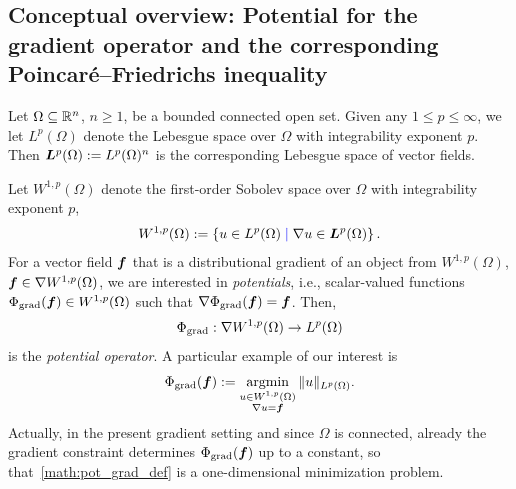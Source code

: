\documentclass[10pt,a4paper]{article}
\newcommand\cye[1]{%
\protect\leavevmode
\begingroup
    \color{blue}%
    #1%
\endgroup
}
\begin{document}
\subsection{Conceptual overview: Potential for the gradient operator and the corresponding Poincar\'e--Friedrichs inequality} \label{subsection:intro_grad}

Let $\Omega \subseteq {\mathbb R}^n$, $n \geq 1$, be a bounded connected open set. Given any $1 \leq p \leq \infty$, we let $L^{p}(\Omega)$ denote the Lebesgue space over $\Omega$ with integrability exponent $p$. Then $\bm{L}^{p}(\Omega) := L^{p}(\Omega)^{n}$ is the corresponding Lebesgue space of vector  fields. 

Let $W^{1,p}(\Omega)$ denote the first-order Sobolev space over $\Omega$ with integrability exponent $p$, 
\begin{align} \label{equation:W1p}
    W^{1,p}(\Omega) := \left\{u \in L^{p}(\Omega) \cye{\suchthat} \nabla u \in \bfL^{p}(\Omega) \right\}.
\end{align}
For a vector field $\bm{f}$ that is a distributional gradient of an object from $W^{1,p}(\Omega)$, $\bm{f} \in \nabla W^{1,p}(\Omega)$, we are \cye{interested in} {\em potentials}, i.e., scalar-valued functions $\Phi_{\operatorname{grad}}( \bm{f} ) \in W^{1,p}(\Omega)$ such that $\nabla \Phi_{\operatorname{grad}}( \bm{f} ) = \bm{f}$. Then, 
%
\begin{align*}
    \Phi_{\operatorname{grad}} : \nabla W^{1,p}(\Omega) \rightarrow L^{p}(\Omega)
\end{align*}
is the {\em potential operator}. A particular example of our interest is
%
\begin{align}\label{math:pot_grad_def}
    \Phi_{\operatorname{grad}}( \bm{f} ) := \operatorname*{{\rm argmin}}\limits_{ \substack{ u \in W^{1,p}(\Omega) \\ \nabla u = \bm{f} } } \| u \|_{L^{p}(\Omega)}.
\end{align}
%
Actually, in the present gradient setting and since $\Omega$ is connected, already the gradient constraint determines $\Phi_{\operatorname{grad}}( \bm{f} )$ up to a constant, so that~\eqref{math:pot_grad_def} is a one-dimensional minimization problem. 
\end{document}
